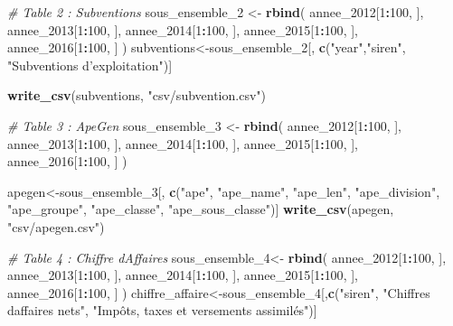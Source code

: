 \documentclass[mstat,12pt]{unswthesis}
\newenvironment{Shaded}{\begin{snugshade}}{\end{snugshade}}
\newcommand{\CommentTok}[1]{\textcolor[rgb]{0.56,0.35,0.01}{\textit{#1}}}
\newcommand{\DecValTok}[1]{\textcolor[rgb]{0.00,0.00,0.81}{#1}}
\newcommand{\FunctionTok}[1]{\textcolor[rgb]{0.13,0.29,0.53}{\textbf{#1}}}
\newcommand{\NormalTok}[1]{#1}
\newcommand{\OtherTok}[1]{\textcolor[rgb]{0.56,0.35,0.01}{#1}}
\newcommand{\SpecialCharTok}[1]{\textcolor[rgb]{0.81,0.36,0.00}{\textbf{#1}}}
\newcommand{\StringTok}[1]{\textcolor[rgb]{0.31,0.60,0.02}{#1}}
\begin{document}
\begin{Shaded}
\begin{Highlighting}[]
\CommentTok{\# Table 2 : Subventions}
\NormalTok{sous\_ensemble\_2 }\OtherTok{\textless{}{-}} \FunctionTok{rbind}\NormalTok{(}
\NormalTok{  annee\_2012[}\DecValTok{1}\SpecialCharTok{:}\DecValTok{100}\NormalTok{, ],}
\NormalTok{  annee\_2013[}\DecValTok{1}\SpecialCharTok{:}\DecValTok{100}\NormalTok{, ],}
\NormalTok{  annee\_2014[}\DecValTok{1}\SpecialCharTok{:}\DecValTok{100}\NormalTok{, ],}
\NormalTok{  annee\_2015[}\DecValTok{1}\SpecialCharTok{:}\DecValTok{100}\NormalTok{, ],}
\NormalTok{  annee\_2016[}\DecValTok{1}\SpecialCharTok{:}\DecValTok{100}\NormalTok{, ]}
\NormalTok{)}
\NormalTok{subventions}\OtherTok{\textless{}{-}}\NormalTok{sous\_ensemble\_2[, }\FunctionTok{c}\NormalTok{(}\StringTok{"year"}\NormalTok{,}\StringTok{"siren"}\NormalTok{, }\StringTok{"Subventions d’exploitation"}\NormalTok{)]}


\FunctionTok{write\_csv}\NormalTok{(subventions, }\StringTok{"csv/subvention.csv"}\NormalTok{)}

\CommentTok{\# Table 3 : ApeGen}
\NormalTok{sous\_ensemble\_3 }\OtherTok{\textless{}{-}} \FunctionTok{rbind}\NormalTok{(}
\NormalTok{  annee\_2012[}\DecValTok{1}\SpecialCharTok{:}\DecValTok{100}\NormalTok{, ],}
\NormalTok{  annee\_2013[}\DecValTok{1}\SpecialCharTok{:}\DecValTok{100}\NormalTok{, ],}
\NormalTok{  annee\_2014[}\DecValTok{1}\SpecialCharTok{:}\DecValTok{100}\NormalTok{, ],}
\NormalTok{  annee\_2015[}\DecValTok{1}\SpecialCharTok{:}\DecValTok{100}\NormalTok{, ],}
\NormalTok{  annee\_2016[}\DecValTok{1}\SpecialCharTok{:}\DecValTok{100}\NormalTok{, ]}
\NormalTok{)}


\NormalTok{apegen}\OtherTok{\textless{}{-}}\NormalTok{sous\_ensemble\_3[, }\FunctionTok{c}\NormalTok{(}\StringTok{"ape"}\NormalTok{, }\StringTok{"ape\_name"}\NormalTok{, }\StringTok{"ape\_len"}\NormalTok{, }\StringTok{"ape\_division"}\NormalTok{, }\StringTok{"ape\_groupe"}\NormalTok{, }\StringTok{"ape\_classe"}\NormalTok{, }\StringTok{"ape\_sous\_classe"}\NormalTok{)]}
\FunctionTok{write\_csv}\NormalTok{(apegen, }\StringTok{"csv/apegen.csv"}\NormalTok{)}

\CommentTok{\# Table 4 : Chiffre d\textquotesingle{}Affaires}
\NormalTok{sous\_ensemble\_4}\OtherTok{\textless{}{-}} \FunctionTok{rbind}\NormalTok{(}
\NormalTok{  annee\_2012[}\DecValTok{1}\SpecialCharTok{:}\DecValTok{100}\NormalTok{, ],}
\NormalTok{  annee\_2013[}\DecValTok{1}\SpecialCharTok{:}\DecValTok{100}\NormalTok{, ],}
\NormalTok{  annee\_2014[}\DecValTok{1}\SpecialCharTok{:}\DecValTok{100}\NormalTok{, ],}
\NormalTok{  annee\_2015[}\DecValTok{1}\SpecialCharTok{:}\DecValTok{100}\NormalTok{, ],}
\NormalTok{  annee\_2016[}\DecValTok{1}\SpecialCharTok{:}\DecValTok{100}\NormalTok{, ]}
\NormalTok{)}
\NormalTok{chiffre\_affaire}\OtherTok{\textless{}{-}}\NormalTok{sous\_ensemble\_4[,}\FunctionTok{c}\NormalTok{(}\StringTok{"siren"}\NormalTok{, }\StringTok{"Chiffres d\textquotesingle{}affaires nets"}\NormalTok{, }\StringTok{"Impôts, taxes et versements assimilés"}\NormalTok{)]}


\end{Highlighting}
\end{Shaded}
\end{document}
